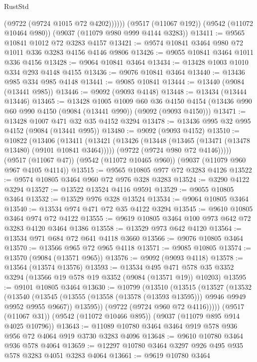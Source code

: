 \begin{lexlean}{RustStd}
\begin{coremodule}
            (@9722 (@9724 @1015 @72 @4202))))))
    (@9517 (@11067 @192))
    (@9542 (@11072 @10464 @980))
    (@9037 (@11079 @980 @999 @4144 @3283))
@13411 := @9565 @10841 @1012 @72 @3283 @4157
@13421 := @9574 @10841 @3464 @980 @72 @1011 @336 @3283 @4156 @4146 @9806
@13426 := @9055 @10841 @3464 @1011 @336 @4156
@13428 := @9064 @10841 @3464
@13434 := @13428 @1003 @1010 @334 @293 @4148 @4155
@13436 := @9076 @10841 @3464
@13440 := @13436 @985 @334 @985 @4148
@13441 := @9085 @10841
@13444 := @13440 (@9084 (@13441 @985))
@13446 := @9092 (@9093 @4148)
@13448 := @13434 (@13444 @13446)
@13465 := @13428
    @1005
    @1009
    @60
    @36
    @4150
    @4154
    (@13436 @990 @60 @990 @4150 (@9084 (@13441 @990)) (@9092 (@9093 @4150)))
@13471 := @13428 @1007 @471 @32 @35 @4152 @3294
@13478 := @13436 @995 @32 @995 @4152 (@9084 (@13441 @995))
@13480 := @9092 (@9093 @4152)
@13510 := @10822
    (@13406
      (@13411
        (@13421
          (@13426 (@13448 (@13465 (@13471 (@13478 @13480) (@9101 @10841 @3464)))))
          (@9722 (@9724 @980 @72 @4146)))))
    (@9517 (@11067 @47))
    (@9542 (@11072 @10465 @960))
    (@9037 (@11079 @960 @967 @4105 @4114))
@13515 := @9565 @10805 @977 @72 @3283 @4126
@13522 := @9574 @10805 @3464 @960 @72 @976 @328 @3283
@13524 := @3290 @4122 @3294
@13527 := @13522 @13524 @4116 @9591
@13529 := @9055 @10805 @3464
@13532 := @13529 @976 @328 @13524
@13534 := @9064 @10805 @3464
@13540 := @13534 @974 @471 @72 @35 @4122 @3294
@13545 := @9610 @10805 @3464 @974 @72 @4122
@13555 := @9619 @10805 @3464 @100 @973 @642 @72 @3283 @4120 @3464 @1386
@13558 := @13529 @973 @642 @4120
@13564 := @13534 @971 @684 @72 @641 @4118 @3660
@13566 := @9076 @10805 @3464
@13570 := @13566 @965 @72 @965 @4118
@13571 := @9085 @10805
@13574 := @13570 (@9084 (@13571 @965))
@13576 := @9092 (@9093 @4118)
@13578 := @13564 (@13574 @13576)
@13593 := @13534
    @495
    @471
    @578
    @35
    @3352
    @3294
    (@13566 @19 @578 @19 @3352 (@9084 (@13571 @19)) @10203)
@13595 := @9101 @10805 @3464
@13630 := @10799
    (@13510
      (@13515
        (@13527
          (@13532
            (@13540
              (@13545 (@13555 (@13558 (@13578 (@13593 @13595))) @9946 @9949 @9952 @9955 @9667))
              @13595))
          (@9722 (@9724 @960 @72 @4116)))))
    (@9517 (@11067 @31))
    (@9542 (@11072 @10466 @895))
    (@9037 (@11079 @895 @914 @4025 @10796))
@13643 := @11089 @10780 @3464 @3464 @919 @578 @936 @956 @72 @4064 @919 @3730 @3283 @4096
@13648 := @9610 @10780 @3464 @936 @578 @4064
@13659 := @12297 @10780 @3464 @3297 @926 @495 @935 @578 @3283 @4051 @3283 @4064
@13661 := @9619 @10780 @3464

\end{coremodule}
\end{lexlean}

